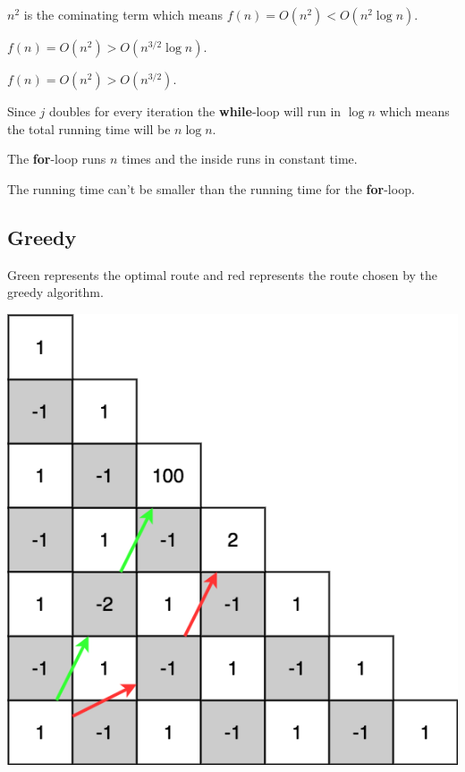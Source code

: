 \documentclass[a4paper]{article}
\newenvironment{task}[1]
{
	\begin{description}[align=right]
		\item [#1]
}{		%
	\end{description}
}
\DeclareMathOperator{\*}{\cdot}
\begin{document}
\begin{task}{1. (a)}
	 $n^2$ is the cominating term which means $f(n)=O(n^2)<O(n^2\log n)$.
\end{task}

\begin{task}{(b)}
	 $f(n)=O(n^2)>O(n^{3/2}\log n)$.
\end{task}

\begin{task}{(c)}
	 $f(n)=O(n^2)>O(n^{3/2})$.
\end{task}

\begin{task}{2. (a)}
	 Since $j$ doubles for every iteration the \textbf{while}-loop will run in $\log n$ which means the total running time will be $n\log n$.
\end{task}

\begin{task}{3. (a)}
	 The \textbf{for}-loop runs $n$ times and the inside runs in constant time.
\end{task}

\begin{task}{(b)}
	 The running time can't be smaller than the running time for the \textbf{for}-loop.
\end{task}

\subsection*{Greedy}

\begin{task}{4. (a)}
	\qquad Green represents the optimal route and red represents the route chosen by the greedy algorithm.
	
	\includegraphics[scale=0.3]{110825-4a.png}
\end{task}
\end{document}
